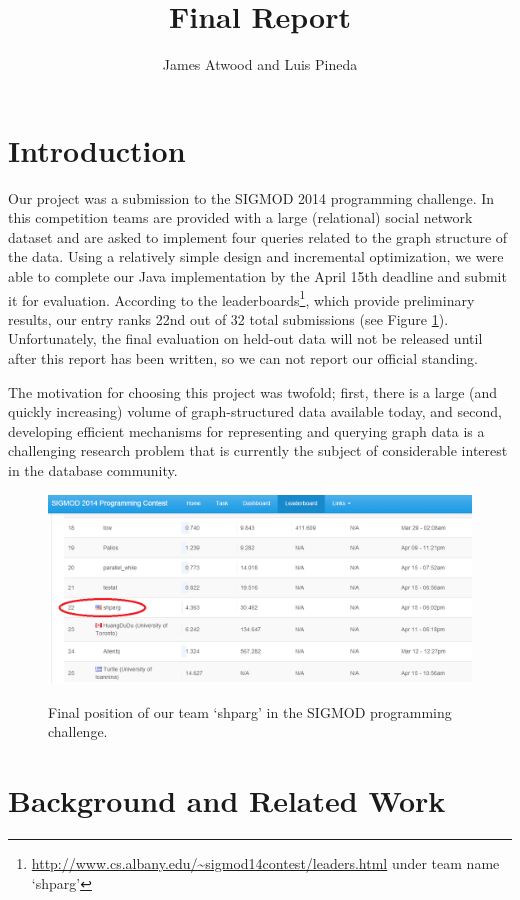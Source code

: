 \documentclass{article}
\title{Final Report}
\author{
James Atwood and Luis Pineda \\ %
}
\begin{document}
\maketitle

\section{Introduction}
Our project was a submission to the SIGMOD 2014 programming challenge. 
In this competition teams are provided with a large (relational) social network
dataset and are asked to implement four queries related to the graph
structure of the data.  Using a relatively simple design and
incremental optimization, we were able to complete our Java
implementation by the April 15th deadline and submit it for
evaluation.  According to the
leaderboards\footnote{\url{http://www.cs.albany.edu/~sigmod14contest/leaders.html} under team name `shparg'},
which provide preliminary results, our entry ranks 22nd out of 32
total submissions (see Figure \ref{fig:leader}).  Unfortunately, the final evaluation on held-out
data will not be released until after this report has been written, so
we can not report our official standing.

The motivation for choosing this project was
twofold; first, there is a large (and quickly increasing) volume of
graph-structured data available today, and second, developing
efficient mechanisms for representing and querying graph data is a
challenging research problem that is currently the subject of
considerable interest in the database community.

\begin{figure}[t]
  \centering
  \includegraphics[scale=0.45]{img/leaderboard.png}
  \label{fig:leader}
  \caption{Final position of our team `shparg' in the SIGMOD programming challenge.}
\end{figure}

\section{Background and Related Work}
\end{document}
